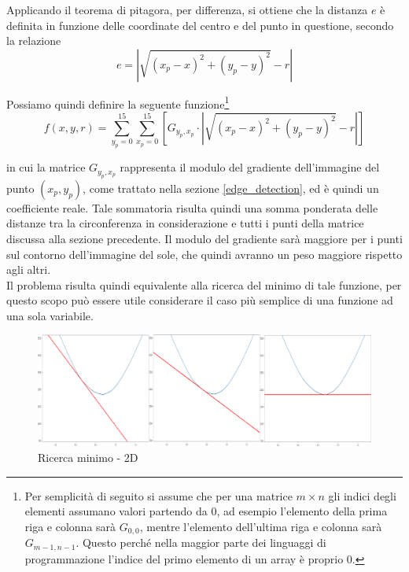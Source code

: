 \documentclass[12pt]{article}
\begin{document}
        
        Applicando il teorema di pitagora, per differenza, si ottiene che la distanza $ e $ è definita in funzione delle coordinate del centro e del punto in questione, secondo la relazione
        \begin{equation}
             e = \left| \sqrt{(x_p-x)^2 + (y_p-y)^2} -r \right|
        \end{equation}
        
        
        Possiamo quindi definire la seguente funzione\footnote{Per semplicità di seguito si assume che per una matrice $m \times n$ gli indici degli elementi assumano valori partendo da 0, ad esempio l'elemento della prima riga e colonna sarà $G_{0,0}$, mentre l'elemento dell'ultima riga e colonna sarà $G_{m-1, n-1}$. Questo perché nella maggior parte dei linguaggi di programmazione l'indice del primo elemento di un array è proprio 0.}
        \begin{equation}
            f(x, y, r) = \sum_{y_p = 0}^{15} \sum_{x_p = 0}^{15} \left[ G_{y_p, x_p} \cdot \left| \sqrt{(x_p-x)^2 + (y_p-y)^2} -r \right| \right] 
        \end{equation}
        
        
        in cui la matrice $ G_{y_p, x_p} $ rappresenta il modulo del gradiente dell'immagine del punto $ (x_p, y_p) $, come trattato nella sezione \ref{edge_detection}, ed è quindi un coefficiente reale. Tale sommatoria risulta quindi una somma ponderata delle distanze tra la circonferenza in considerazione e tutti i punti della matrice discussa alla sezione precedente. Il modulo del gradiente sarà maggiore per i punti sul contorno dell'immagine del sole, che quindi avranno un peso maggiore rispetto agli altri.\\
        
        Il problema risulta quindi equivalente alla ricerca del minimo di tale funzione, per questo scopo può essere utile considerare il caso più semplice di una funzione ad una sola variabile.
        
        \begin{figure}[h]
        \centering
            \includegraphics[width=\textwidth]{Draws/matplotlib_draws/2d_descent_block.png}
            \caption{Ricerca minimo - 2D}
            \label{2d_min_search}
        \end{figure}
        
\end{document}
